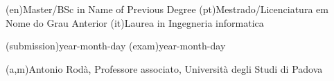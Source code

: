 \ntauthordegree(en){Master/BSc in Name of Previous Degree}
\ntauthordegree(pt){Mestrado/Licenciatura em Nome do Grau Anterior}
\ntauthordegree(it){Laurea in Ingegneria informatica}

\ntdate(submission){year-month-day}
\ntdate(exam){year-month-day}

(a,m){Antonio Rodà, Professore associato, Università degli Studi di Padova}


